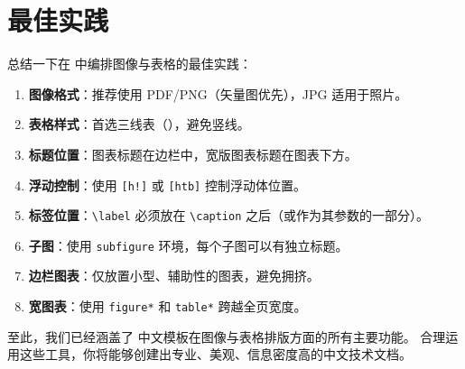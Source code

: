 
\section{最佳实践}

总结一下在  中编排图像与表格的最佳实践：

\begin{kaobox}[title=图像与表格最佳实践]
\begin{enumerate}
    \item \textbf{图像格式}：推荐使用 PDF/PNG（矢量图优先），JPG 适用于照片。
    \item \textbf{表格样式}：首选三线表（），避免竖线。
    \item \textbf{标题位置}：图表标题在边栏中，宽版图表标题在图表下方。
    \item \textbf{浮动控制}：使用 \texttt{[h!]} 或 \texttt{[htb]} 控制浮动体位置。
    \item \textbf{标签位置}：\texttt{\textbackslash label} 必须放在
        \texttt{\textbackslash caption} 之后（或作为其参数的一部分）。
    \item \textbf{子图}：使用 \texttt{subfigure} 环境，每个子图可以有独立标题。
    \item \textbf{边栏图表}：仅放置小型、辅助性的图表，避免拥挤。
    \item \textbf{宽图表}：使用 \texttt{figure*} 和 \texttt{table*} 跨越全页宽度。
\end{enumerate}
\end{kaobox}

至此，我们已经涵盖了  中文模板在图像与表格排版方面的所有主要功能。
合理运用这些工具，你将能够创建出专业、美观、信息密度高的中文技术文档。

\endinput
